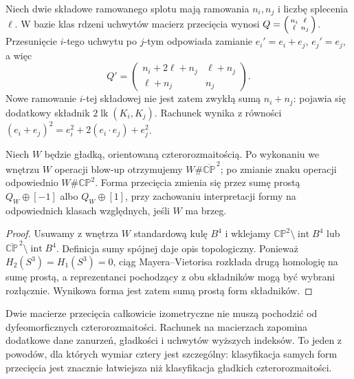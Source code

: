 \begin{przyklad}
Niech dwie składowe ramowanego splotu mają ramowania
$n_i,n_j$ i liczbę splecenia $\ell$. W bazie klas
rdzeni uchwytów macierz przecięcia wynosi
$Q=\begin{psmallmatrix}n_i&\ell\\\ell&n_j\end{psmallmatrix}$.
Przesunięcie $i$-tego uchwytu po $j$-tym odpowiada
zamianie $e_i'=e_i+e_j$, $e_j'=e_j$, a więc
\[
Q'=\begin{pmatrix}n_i+2\ell+n_j&\ell+n_j\\
\ell+n_j&n_j\end{pmatrix}.
\]
Nowe ramowanie $i$-tej składowej nie jest zatem zwykłą
sumą $n_i+n_j$: pojawia się dodatkowy składnik
$2\operatorname{lk}(K_i,K_j)$. Rachunek wynika z
równości $(e_i+e_j)^2=e_i^2+2(e_i\cdot e_j)+e_j^2$.
\end{przyklad}

\begin{stwierdzenie}[Blow-up]
Niech $W$ będzie gładką, orientowaną czterorozmaitością.
Po wykonaniu we wnętrzu $W$ operacji blow-up otrzymujemy
$W\#\overline{\mathbb{CP}}^{\,2}$; po zmianie znaku
operacji odpowiednio $W\#\mathbb{CP}^2$.
Forma przecięcia zmienia się przez sumę prostą
$Q_W\oplus[-1]$ albo $Q_W\oplus[1]$,
przy zachowaniu interpretacji formy na odpowiednich
klasach względnych, jeśli $W$ ma brzeg.
\end{stwierdzenie}

\begin{proof}
Usuwamy z wnętrza $W$ standardową kulę $B^4$ i wklejamy
$\mathbb{CP}^2\setminus\operatorname{int}B^4$ lub
$\overline{\mathbb{CP}}^{\,2}\setminus\operatorname{int}B^4$.
Definicja sumy spójnej daje opis topologiczny.
Ponieważ $H_2(S^3)=H_1(S^3)=0$, ciąg Mayera--Vietorisa
rozkłada drugą homologię na sumę prostą, a reprezentanci
pochodzący z obu składników mogą być wybrani rozłącznie.
Wynikowa forma jest zatem sumą prostą form składników.
\end{proof}

\begin{uwaga}
Dwie macierze przecięcia całkowicie izometryczne nie muszą
pochodzić od dyfeomorficznych czterorozmaitości.
Rachunek na macierzach zapomina dodatkowe dane zanurzeń,
gładkości i uchwytów wyższych indeksów. To jeden z powodów,
dla których wymiar cztery jest szczególny: klasyfikacja
samych form przecięcia jest znacznie łatwiejsza niż
klasyfikacja gładkich czterorozmaitości.
\end{uwaga}

